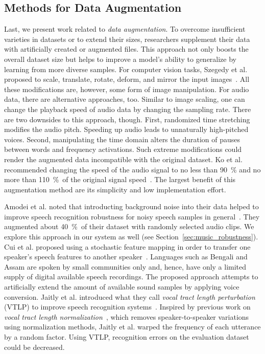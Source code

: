 \subsection{Methods for Data Augmentation}
Last, we present work related to \emph{data augmentation}. To overcome insufficient varieties in datasets or to extend their sizes, researchers supplement their data with artificially created or augmented files. This approach not only boosts the overall dataset size but helps to improve a model's ability to generalize by learning from more diverse samples. For computer vision tasks, Szegedy et al. proposed to scale, translate, rotate, deform, and mirror the input images~\cite{szegedy2015going}. All these modifications are, however, some form of image manipulation. For audio data, there are alternative approaches, too. Similar to image scaling, one can change the playback speed of audio data by changing the sampling rate. There are two downsides to this approach, though. First, randomized time stretching modifies the audio pitch. Speeding up audio leads to unnaturally high-pitched voices. Second, manipulating the time domain alters the duration of pauses between words and frequency activations. Such extreme modifications could render the augmented data incompatible with the original dataset. Ko et al. recommended changing the speed of the audio signal to no less than \SI{90}{\percent} and no more than \SI{110}{\percent}~of the original signal speed~\cite{ko2015audio}. The largest benefit of this augmentation method are its simplicity and low implementation effort.

Amodei et al. noted that introducting background noise into their data helped to improve speech recognition robustness for noisy speech samples in general~\cite{amodei2015deep}. They augmented about \SI{40}{\percent}~of their dataset with randomly selected audio clips. We explore this approach in our system as well (see Section~\ref{sec:music_robustness}). Cui et al. proposed using a stochastic feature mapping in order to transfer one speaker's speech features to another speaker~\cite{cui2015data}. Languages such as Bengali and Assam are spoken by small communities only and, hence, have only a limited supply of digital available speech recordings. The proposed approach attempts to artificially extend the amount of available sound samples by applying voice conversion.
Jaitly et al. introduced what they call \emph{vocal tract length perturbation} (VTLP) to improve speech recognition systems~\cite{jaitly2013vocal}. Inspired by previous work on \emph{vocal tract length normalization}~\cite{eide1996parametric}, which removes speaker-to-speaker variations using normalization methods, Jaitly et al. warped the frequency of each utterance by a random factor. Using VTLP, recognition errors on the evaluation dataset could be decreased.
